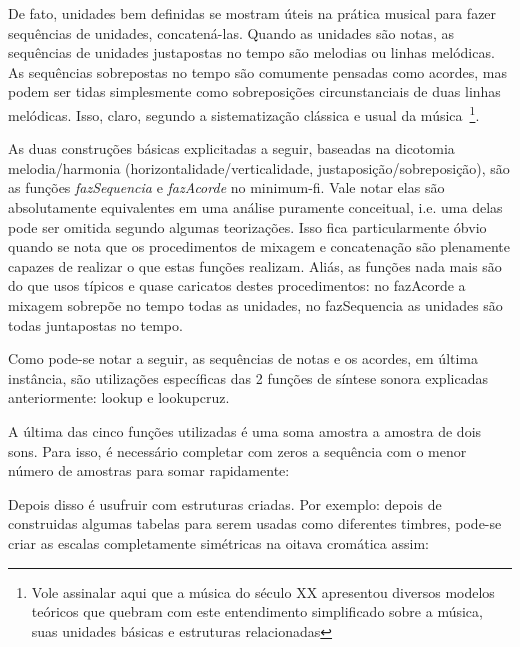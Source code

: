De fato, unidades bem definidas se mostram úteis na prática musical 
para fazer sequências de unidades, concatená-las. Quando as unidades
são notas, as sequências de unidades justapostas no tempo são melodias ou linhas melódicas. As
sequências sobrepostas no tempo são comumente pensadas como acordes, mas podem ser tidas simplesmente
como sobreposições circunstanciais de duas linhas melódicas. Isso, claro, segundo
a sistematização clássica e usual da música~\cite{Lacerda}\footnote{Vole assinalar aqui que a música do século XX apresentou diversos modelos teóricos que quebram com este entendimento simplificado sobre a música, suas unidades básicas e estruturas relacionadas}.

As duas construções básicas explicitadas a seguir, baseadas na dicotomia melodia/harmonia
(horizontalidade/verticalidade, justaposição/sobreposição), são
as funções \emph{fazSequencia} e \emph{fazAcorde} no minimum-fi. Vale notar elas são absolutamente 
equivalentes em uma análise puramente conceitual, i.e. uma delas pode ser omitida segundo algumas teorizações. Isso fica particularmente óbvio quando se nota que os procedimentos de mixagem e concatenação são
plenamente capazes de realizar o que estas funções realizam. Aliás, as funções nada
mais são do que usos típicos e quase caricatos destes procedimentos: no fazAcorde a mixagem
sobrepõe no tempo todas as unidades, no fazSequencia as unidades são todas juntapostas no tempo.

Como pode-se notar a seguir, as sequências de notas e os acordes, em última instância, são utilizações específicas das 2 funções de síntese sonora explicadas anteriormente: lookup e lookupcruz.



A última das cinco funções utilizadas é uma soma amostra a amostra de dois sons. Para isso,
é necessário completar com zeros a sequência com o menor número de amostras para somar rapidamente:


Depois disso é usufruir com estruturas criadas. Por exemplo: depois de construidas
algumas tabelas para serem usadas como diferentes timbres, pode-se criar as
escalas completamente simétricas na oitava cromática assim:


